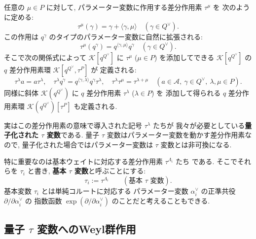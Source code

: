 \documentclass[12pt,twoside,dvipdfm]{msjproc}
\theoremstyle{definition} %
\theoremstyle{definition} %
\theoremstyle{definition} %
\numberwithin{theorem}{section}
\numberwithin{equation}{section}
\numberwithin{figure}{section}
\numberwithin{table}{section}
\newcommand\bra{\langle}
\newcommand\ket{\rangle}
\newcommand\A{\mathcal{A}}
\newcommand\K{\mathcal{K}}
\newcommand\av{\alpha^\vee}
\newcommand\Qv{{Q^\vee}}
\begin{document}
任意の $\mu\in P$ に対して, 
パラメーター変数に作用する差分作用素 $\tau^\mu$ を
次のように定める:
\begin{equation*}
  \tau^\mu(\gamma) = \gamma + \bra\gamma,\mu\ket
  \quad (\gamma\in\Qv).
\end{equation*}
この作用は $q^\gamma$ のタイプのパラメーター変数に自然に拡張される:
\begin{equation*}
  \tau^\mu(q^\gamma) = q^{\bra\gamma,\mu\ket}q^\gamma
  \quad (\gamma\in\Qv).
\end{equation*}
そこで次の関係式によって $\K[q^\Qv]$ に $\tau^\mu$ ($\mu\in P$)
を添加してできる $\K[q^\Qv]$ の $q$ 差分作用素環 $\K[q^\Qv,\tau^P]$ が
定義される:
\begin{equation*}
 \tau^\lambda a = a \tau^\lambda, \quad
 \tau^\lambda q^\gamma = q^{\bra\gamma,\lambda\ket} q^\gamma \tau^\lambda, \quad
 \tau^\lambda \tau^\mu = \tau^{\lambda+\mu} \quad
 (a\in\A,\ \gamma\in\Qv,\ \lambda,\mu\in P).
\end{equation*}
同様に斜体 $\K(q^\Qv)$ に $q$ 差分作用素 $\tau^\lambda$ ($\lambda\in P$) を
添加して得られる $q$ 差分作用素環 $\K(q^\Qv)[\tau^P]$ も定義される.


実はこの差分作用素の意味で導入された記号 $\tau^\lambda$ たちが
我々が必要としている{\bf 量子化された $\tau$ 変数}である.
量子 $\tau$ 変数はパラメーター変数を動かす差分作用素なので, 
量子化された場合ではパラメーター変数は $\tau$ 変数とは非可換になる. 

特に重要なのは基本ウェイトに対応する差分作用素 $\tau^{\Lambda_i}$ たち
である.  そこでそれらを $\tau_i$ と書き, 
{\bf 基本 $\tau$ 変数}と呼ぶことにする:
\begin{equation*}
  \tau_i := \tau^{\Lambda_i}  \qquad
 (\text{基本 $\tau$ 変数}).
\end{equation*}
基本変数 $\tau_i$ とは単純コルートに対応する
パラメーター変数 $\av_i$ の正準共役 $\partial/\partial\av_i$ の
指数函数 $\exp(\partial/\partial\av_i)$ のことだと考えることもできる.



\subsection{量子 $\tau$ 変数へのWeyl群作用}
\end{document}
